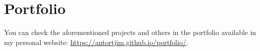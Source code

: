 \documentclass[paper=a4,fontsize=11pt]{article}
\newcommand{\NewPart}[1]{
\vspace{-15pt}
\section*{
{#1}}}
\begin{document}
%

\NewPart{Portfolio}

You can check the aforementioned projects and others in the portfolio available in my personal website:
\href{https://antortjim.github.io/portfolio/}{\color{blue}https://antortjim.github.io/portfolio/}.







\newpage

%
%
%
%
\end{document}
